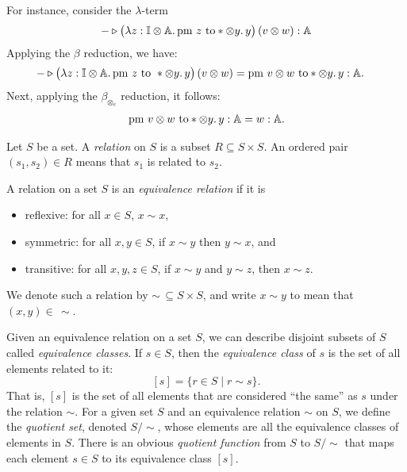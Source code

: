 \begin{example} \label{ex:eq_contex_gen}
  For instance, consider the $\lambda$-term 
  $$ - \triangleright \big(\lambda z : \mathbb{I} \otimes \mathbb{A}. \, \text{pm } z \text{ to} * \otimes y. \, y\big) \, (v \otimes w): \mathbb{A}$$
Applying the $\beta$ reduction, we have:
\begin{align*}
 - \triangleright \big(\lambda z : \mathbb{I} \otimes \mathbb{A}. \, \text{pm } z \text{ to } * \otimes y. \, y\big) \, (v \otimes w) 
&= \text{pm }  v \otimes w \text{ to} * \otimes y. \, y : \mathbb{A}. 
\end{align*}
Next, applying the $\beta_{\otimes_e}$ reduction, it follows:
\begin{align*}
\text{pm }  v \otimes w \text{ to} * \otimes y. \, y : \mathbb{A} = w : \mathbb{A}. 
\end{align*}
\end{example}





\begin{definition}
  Let \( S \) be a set. A \emph{relation} on \( S \) is a subset \( R \subseteq S \times S \). An ordered pair \( (s_1, s_2) \in R \) means that \( s_1 \) is related to \( s_2 \).
\end{definition}


\begin{definition}
  A relation on a set \( S \) is an \emph{equivalence relation} if it is
\begin{itemize}
  \item reflexive: for all \( x \in S \), \( x \sim x \),
  \item symmetric: for all \( x, y \in S \), if \( x \sim y \) then \( y \sim x \), and
  \item transitive: for all \( x, y, z \in S \), if \( x \sim y \) and \( y \sim z \), then \( x \sim z \).
\end{itemize} 
We denote such a relation by \( \sim \,\subseteq S \times S \), and write \( x \sim y \) to mean that \( (x, y) \in \, \sim \).
\end{definition}

\begin{definition}
  Given an equivalence relation on a set \( S \), we can describe disjoint subsets of \( S \) called \emph{equivalence classes}. If \( s \in S \), then the \emph{equivalence class} of \( s \) is the set of all elements related to it:
\[
[s] = \{ r \in S \mid r \sim s \}.
\]
That is, \( [s] \) is the set of all elements that are considered “the same” as \( s \) under the relation \( \sim \). For a given set \( S \) and an equivalence relation \( \sim \) on \( S \), we define the \emph{quotient set}, denoted \( S / \sim \), whose elements are all the equivalence classes of elements in \( S \). There is an obvious \emph{quotient function} from \( S \) to \( S / \sim \) that maps each element \( s \in S \) to its equivalence class \( [s] \).
\end{definition}

